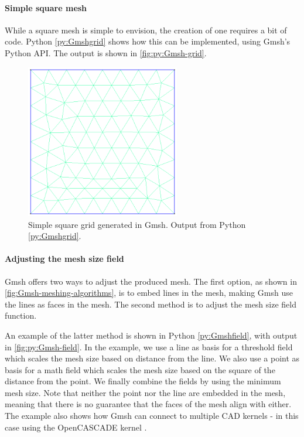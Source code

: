 \paragraph{Simple square mesh}
While a square mesh is simple to envision, the creation of one requires a bit of code. Python \ref{py:Gmshgrid} shows how this can be implemented, using Gmsh's Python API. The output is shown in \autoref{fig:py:Gmsh-grid}.


\begin{figure}[htp]
    \centering
    \includegraphics[width=0.6\textwidth]{report/Images/Software/Gmsh examples/gmsh_square_mesh.png}
    \caption[Simple square grid generated in Gmsh]{Simple square grid generated in Gmsh. Output from Python \ref{py:Gmshgrid}.}
    \label{fig:py:Gmsh-grid}
\end{figure}


\paragraph{Adjusting the mesh size field}
Gmsh offers two ways to adjust the produced mesh. The first option, as shown in \autoref{fig:Gmsh-meshing-algorithms}, is to embed lines in the mesh, making Gmsh use the lines as faces in the mesh. The second method is to adjust the mesh size field function.

An example of the latter method is shown in Python \ref{py:Gmshfield}, with output in \autoref{fig:py:Gmsh-field}. In the example, we use a line as basis for a threshold field which scales the mesh size based on distance from the line. We also use a point as basis for a math field which scales the mesh size based on the square of the distance from the point. We finally combine the fields by using the minimum mesh size. Note that neither the point nor the line are embedded in the mesh, meaning that there is no guarantee that the faces of the mesh align with either. The example also shows how Gmsh can connect to multiple CAD kernels - in this case using the OpenCASCADE kernel \cite{Gmsh_reference}.

